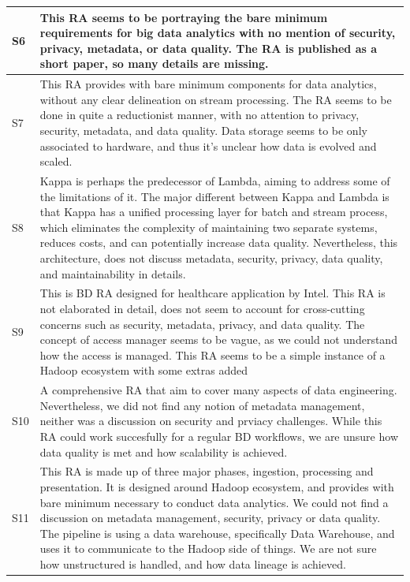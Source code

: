 \documentclass[review]{elsarticle}
\begin{document}
\begin{longtable}{|p{0.5cm}|p{11cm}|}
        \hline
        S6 & This RA seems to be portraying the bare minimum requirements for big data analytics with no mention of security, privacy, metadata, or data quality. The RA is published as a short paper, so many details are missing. \\
        \hline
        S7 & This RA provides with bare minimum components for data analytics, without any clear delineation on stream processing. The RA seems to be done in quite a reductionist manner, with no attention to privacy, security, metadata, and data quality. Data storage seems to be only associated to hardware, and thus it's unclear how data is evolved and scaled.  \\
        \hline
        S8 & Kappa is perhaps the predecessor of Lambda, aiming to address some of the limitations of it. The major different between Kappa and Lambda is that Kappa has a unified processing layer for batch and stream process, which eliminates the complexity of maintaining two separate systems, reduces costs, and can potentially increase data quality. Nevertheless, this architecture, does not discuss metadata, security, privacy, data quality, and maintainability in details.  \\
        \hline
        S9 & This is BD RA designed for healthcare application by Intel. This RA is not elaborated in detail, does not seem to account for cross-cutting concerns such as security, metadata, privacy, and data quality. The concept of access manager seems to be vague, as we could not understand how the access is managed. This RA seems to be a simple instance of a Hadoop ecosystem with some extras added   \\
        \hline
        S10 & A comprehensive RA that aim to cover many aspects of data engineering. Nevertheless, we did not find any notion of metadata management, neither was a discussion on security and prviacy challenges. While this RA could work succesfully for a regular BD workflows, we are unsure how data quality is met and how scalability is achieved.  \\
        \hline
        S11 & This RA is made up of three major phases, ingestion, processing and presentation. It is designed around Hadoop ecosystem, and provides with bare minimum necessary to conduct data analytics. We could not find a discussion on metadata management, security, privacy or data quality. The pipeline is using a data warehouse, specifically Data Warehouse, and uses it to communicate to the Hadoop side of things. We are not sure how unstructured is handled, and how data lineage is achieved.  \\

\end{longtable}
\end{document}
